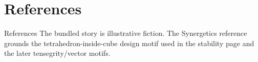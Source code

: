 \documentclass[
  ignorenonframetext,
]{beamer}
\author{\texorpdfstring{}{}}
\date{}
\begin{document}
\section{References}\label{references}

\begin{frame}[allowframebreaks]{References}
The bundled story is illustrative fiction. The Synergetics reference
grounds the tetrahedron-inside-cube design motif used in the stability
page and the later tensegrity/vector motifs.
\end{frame}
\end{document}
